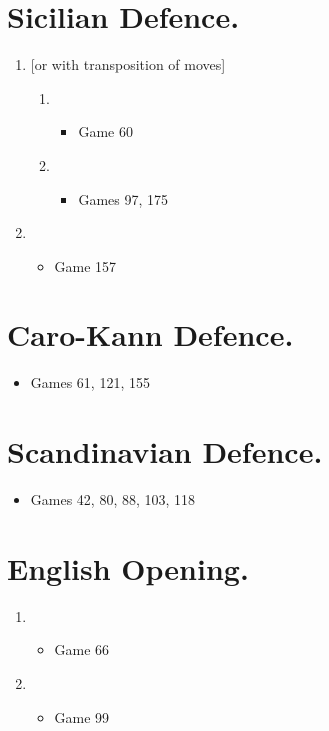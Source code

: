 \begin{multicols}{2}
\section{Sicilian Defence.}
\newgame{}
\begin{enumerate}
\item {} [or with transposition of moves] 
\begin{enumerate}
\item {}
\begin{itemize}
\item Game 60
\end{itemize}
\item {}
\begin{itemize}
\item Games 97, 175
\end{itemize}
\end{enumerate}
\item {}
\begin{itemize}
\item Game 157
\end{itemize}
\end{enumerate}

\section{Caro-Kann Defence.}
\newgame{}
\begin{itemize}
\item Games 61, 121, 155
\end{itemize}

\section{Scandinavian Defence.}
\newgame{}
\begin{itemize}
\item Games 42, 80, 88, 103, 118
\end{itemize}

\section{English Opening.}
\newgame{}
\begin{enumerate}
\item {}
\begin{itemize}
\item Game 66
\end{itemize}
\item {}
\begin{itemize}
\item Game 99
\end{itemize}
\end{enumerate}

\end{multicols}